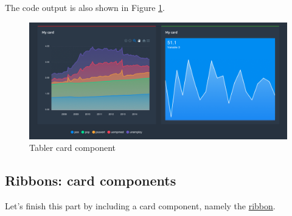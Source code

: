 \documentclass[
]{book}
\newenvironment{Shaded}{\begin{snugshade}}{\end{snugshade}}
\newcommand{\ControlFlowTok}[1]{\textcolor[rgb]{0.13,0.29,0.53}{\textbf{#1}}}
\newcommand{\DataTypeTok}[1]{\textcolor[rgb]{0.13,0.29,0.53}{#1}}
\newcommand{\KeywordTok}[1]{\textcolor[rgb]{0.13,0.29,0.53}{\textbf{#1}}}
\newcommand{\NormalTok}[1]{#1}
\newcommand{\OperatorTok}[1]{\textcolor[rgb]{0.81,0.36,0.00}{\textbf{#1}}}
\newcommand{\OtherTok}[1]{\textcolor[rgb]{0.56,0.35,0.01}{#1}}
\newcommand{\StringTok}[1]{\textcolor[rgb]{0.31,0.60,0.02}{#1}}
\begin{document}
The code output is also shown in Figure \ref{fig:tabler-card}.

\begin{figure}
\includegraphics[width=14.85in]{images/practice/tabler-card} \caption{Tabler card component}\label{fig:tabler-card}
\end{figure}

\hypertarget{ribbons-card-components}{%
\subsection{Ribbons: card components}\label{ribbons-card-components}}

Let's finish this part by including a card component, namely the \href{https://preview-dev.tabler.io/docs/ribbons.html}{ribbon}.

\begin{Shaded}
\end{Shaded}
\end{document}
